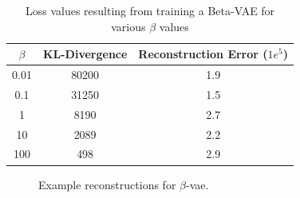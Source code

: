 \begin{table}[!ht]
    \centering
    \caption{Loss values resulting from training a Beta-VAE for various $\beta$ values}
    \label{tab:beta-vae-loss-values}
    \begin{tabular}{ccc}
        \hline
        $\beta$ & KL-Divergence & Reconstruction Error ($1e^5$) \\
        \hline
        0.01    & 80200         & 1.9                           \\
        0.1     & 31250         & 1.5                           \\
        1       & 8190          & 2.7                           \\
        10      & 2089          & 2.2                           \\
        100     & 498           & 2.9                           \\
        \hline
    \end{tabular}
\end{table}

\begin{figure}[!ht]
    \centering
    \caption{Example reconstructions for $\beta$-vae.}
    \label{fig:beta-vae-recon-examples}
     \quad
\end{figure}


